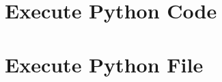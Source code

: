 \documentclass{article}
\begin{document}
\section{Execute Python Code}


\section{Execute Python File}

\end{document}
